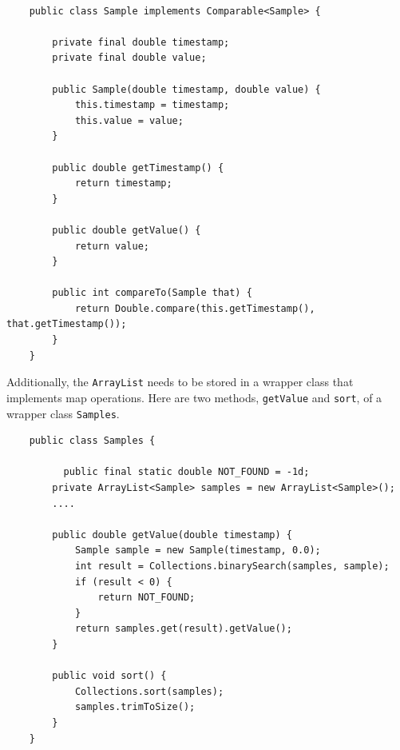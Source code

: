 \ttfamily
\begin{verbatim}
   
    public class Sample implements Comparable<Sample> {

        private final double timestamp;
        private final double value;
	
        public Sample(double timestamp, double value) {
            this.timestamp = timestamp;
            this.value = value;
        }
	
        public double getTimestamp() {
            return timestamp;
        }
	
        public double getValue() {
            return value;
        }
	      
        public int compareTo(Sample that) {
            return Double.compare(this.getTimestamp(), that.getTimestamp());	
        }
    }

\end{verbatim}
\normalfont
Additionally, the \texttt{ArrayList} needs to be stored in a wrapper class that implements map operations. Here are two methods, \texttt{getValue} and \texttt{sort}, of a wrapper class \texttt{Samples}. 
\ttfamily
\begin{verbatim}
    public class Samples {
    
    	  public final static double NOT_FOUND = -1d;
        private ArrayList<Sample> samples = new ArrayList<Sample>();
        ....
		
        public double getValue(double timestamp) {
            Sample sample = new Sample(timestamp, 0.0);
            int result = Collections.binarySearch(samples, sample);
            if (result < 0) {
            	return NOT_FOUND;
            }
            return samples.get(result).getValue();
        }
		
        public void sort() {
            Collections.sort(samples);
            samples.trimToSize();	
        }
    }
    
\end{verbatim}
\normalfont 
  
